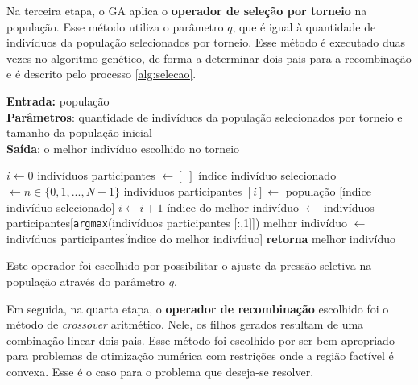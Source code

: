 \documentclass[a4paper, 12pt]{article}
\renewcommand{\Return}{\textbf{retorna}\xspace}
\newenvironment{brprocess}[1][]
  {\begin{algorithm}[#1]
     \selectlanguage{brazilian}%
     \floatname{algorithm}{Processo}%
     \renewcommand{\algorithmicif}{\textbf{se}}%
     \renewcommand{\algorithmicfor}{\textbf{para}}%
     \renewcommand{\algorithmicdo}{\textbf{faça}}%
     \renewcommand{\algorithmicthen}{\textbf{faça}}%
     \renewcommand{\algorithmicend}{\textbf{fim}}%
     \renewcommand{\algorithmicwhile}{\textbf{enquanto}}%
     \renewcommand{\algorithmicelse}{\textbf{caso contrário}}%
  }
  {\end{algorithm}}
\begin{document}
Na terceira etapa, o GA aplica o \textbf{operador de seleção por torneio} na população. Esse método utiliza o parâmetro $q$, que é igual à quantidade de indivíduos da população selecionados por torneio. Esse método é executado duas vezes no algoritmo genético, de forma a determinar dois pais para a recombinação e é descrito pelo processo \ref{alg:selecao}.
\begin{brprocess}[!ht]
    \cprotect\caption{Operador de seleção por torneio (\verb|selecao_torneio(populacao,|
    \verb|N, q_torneio)|}
    \textbf{Entrada:} população\\
    \textbf{Parâmetros}: quantidade de indivíduos da população selecionados por torneio e tamanho da população inicial\\
    \textbf{Saída}: o melhor indivíduo escolhido no torneio
    \begin{algorithmic}
            \State $i \gets 0$
            \State indivíduos participantes $\gets [\;]$
                \State índice indivíduo selecionado $\gets n \in \{0, 1, ..., N - 1\}$
                \State indivíduos participantes $[i] \gets$ população [índice indivíduo selecionado]
                \State $i \gets i + 1$
            \EndWhile
            \State índice do melhor indivíduo $\gets$ indivíduos participantes[\verb|argmax|(indivíduos participantes [:,1]])
            \State melhor indivíduo $\gets$ indivíduos participantes[índice do melhor indivíduo]
            \State \Return melhor indivíduo
    \end{algorithmic}
    \label{alg:selecao}
\end{brprocess}

Este operador foi escolhido por possibilitar o ajuste da pressão seletiva na população através do parâmetro $q$.

Em seguida, na quarta etapa, o \textbf{operador de recombinação} escolhido foi o método de \textit{crossover} aritmético. Nele, os filhos gerados resultam de uma combinação linear dois pais. Esse método foi escolhido por ser bem apropriado para problemas de otimização numérica com restrições onde a região factível é convexa. Esse é o caso para o problema que deseja-se resolver.
\end{document}
